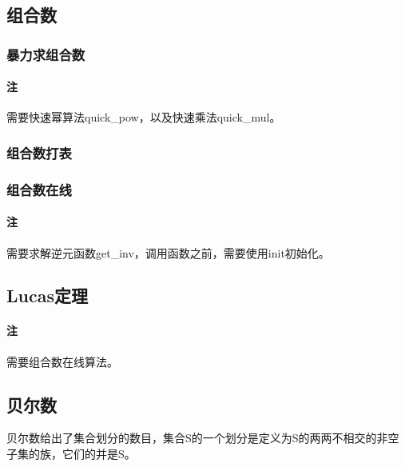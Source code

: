 

\subsection{组合数}

\subsubsection{暴力求组合数}

\paragraph{注} 需要快速幂算法quick\_pow，以及快速乘法quick\_mul。



\subsubsection{组合数打表}


\subsubsection{组合数在线}

\paragraph{注} 需要求解逆元函数get\_inv，调用函数之前，需要使用init初始化。



\subsection{Lucas定理}

\paragraph{注} 需要组合数在线算法。



\subsection{贝尔数}

贝尔数给出了集合划分的数目，集合S的一个划分是定义为S的两两不相交的非空子集的族，它们的并是S。


